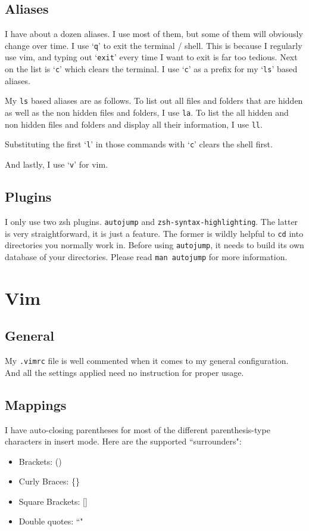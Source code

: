 \documentclass[12pt, a4paper]{article}
\begin{document}
\subsection{Aliases}

I have about a dozen aliases.
I use most of them, but some of them will obviously change over time.
I use `\texttt{q}' to exit the terminal / shell.
This is because I regularly use vim, and typing out `\texttt{exit}' every time I want to exit is far too tedious.
Next on the list is `\texttt{c}' which clears the terminal.
I use `\texttt{c}' as a prefix for my `\texttt{ls}' based aliases.

My \texttt{ls} based aliases are as follows.
To list out all files and folders that are hidden as well as the non hidden files and folders, I use \texttt{la}.
To list the all hidden and non hidden files and folders and display all their information, I use \texttt{ll}.

Substituting the first `\texttt{l}' in those commands with `\texttt{c}' clears the shell first.

And lastly, I use `\texttt{v}' for vim.

\subsection{Plugins}

I only use two zsh plugins.
\texttt{autojump} and \texttt{zsh-syntax-highlighting}.
The latter is very straightforward, it is just a feature.
The former is wildly helpful to \texttt{cd} into directories you normally work in.
Before using \texttt{autojump}, it needs to build its own database of your directories.
Please read \texttt{man autojump} for more information.

\section{Vim}

\subsection{General}
My \texttt{.vimrc} file is well commented when it comes to my general configuration.
And all the settings applied need no instruction for proper usage.

\subsection{Mappings}
I have auto-closing parentheses for most of the different parenthesis-type characters in insert mode.
Here are the supported ``surrounders":

\begin{itemize}
	\item Brackets: ()
	\item Curly Braces: \{\}
	\item Square Brackets: []
	\item Double quotes: ``"
\end{itemize}
\end{document}
